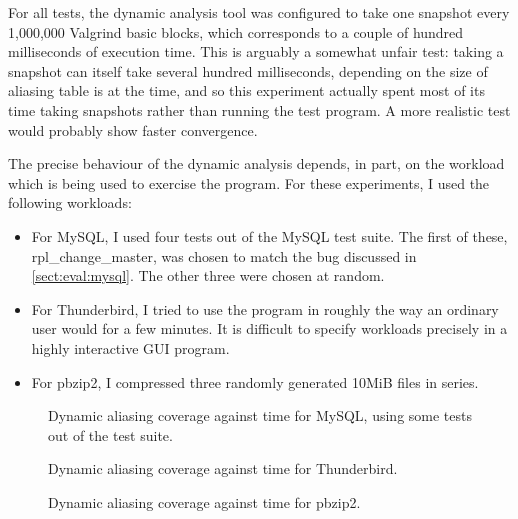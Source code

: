 For all tests, the dynamic analysis tool was configured to take one
snapshot every 1,000,000 Valgrind basic blocks, which corresponds to a
couple of hundred milliseconds of execution time. This is arguably a
somewhat unfair test: taking a snapshot can itself take several
hundred milliseconds, depending on the size of aliasing table is at
the time, and so this experiment actually spent most of its time
taking snapshots rather than running the test program.  A more
realistic test would probably show faster convergence.

The precise behaviour of the dynamic analysis depends, in part, on the
workload which is being used to exercise the program.  For these
experiments, I used the following workloads:

\begin{itemize}
\item For MySQL, I used four tests out of the MySQL test suite. The
  first of these, rpl\_change\_master, was chosen to match the bug
  discussed in \autoref{sect:eval:mysql}.  The other three were chosen
  at random.
\item For Thunderbird, I tried to use the program in roughly the way
  an ordinary user would for a few minutes.  It is difficult to
  specify workloads precisely in a highly interactive GUI
  program.
\item For pbzip2, I compressed three randomly generated 10MiB files in
  series.
\end{itemize}

\begin{figure}
  \caption{Dynamic aliasing coverage against time for MySQL, using
    some tests out of the test suite.}
  \label{fig:eval:dyn_convergence:mysqld}
\end{figure}

\begin{figure}
  
  \caption{Dynamic aliasing coverage against time for Thunderbird.}
  \label{fig:eval:dyn_convergence:thunderbird}
\end{figure}

\begin{figure}
  
  \caption{Dynamic aliasing coverage against time for pbzip2.}
  \label{fig:eval:dyn_convergence:pbzip2}
\end{figure}

